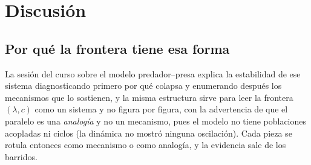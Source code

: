 \section{Discusión}\label{sec:discusion}

\subsection{Por qué la frontera tiene esa forma}

La sesión del curso sobre el modelo predador–presa explica la estabilidad de ese sistema diagnosticando primero por qué colapsa y enumerando después los mecanismos que lo sostienen, y la misma estructura sirve para leer la frontera $(\lambda, c)$ como un sistema y no figura por figura, con la advertencia de que el paralelo es una \emph{analogía} y no un mecanismo, pues el modelo no tiene poblaciones acopladas ni ciclos (la dinámica no mostró ninguna oscilación). Cada pieza se rotula entonces como mecanismo o como analogía, y la evidencia sale de los barridos.

